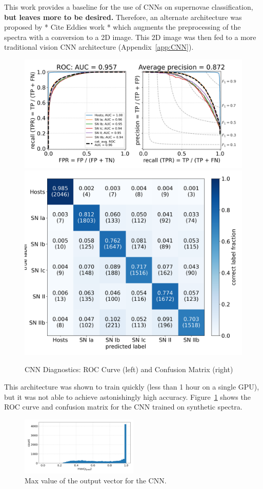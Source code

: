 This work provides a baseline for the use of CNNs on supernovae classification, 
\textbf{but leaves more to be desired.} Therefore, an alternate architecture was proposed 
by * Cite Eddies work * which augments the preprocessing of the spectra with 
a conversion to a 2D image. This 2D image was then fed to a more traditional vision 
CNN architecture (Appendix~\ref{app:CNN}). 
\begin{figure}[t]
    \centering
    \includegraphics[width=.4\textwidth]{figures/cnn/cnn_rocfull.png}
    \includegraphics[width=.4\textwidth]{figures/cnn/cnn_cmfull.png}
    \caption{CNN Diagnostics: ROC Curve (left) and Confusion Matrix (right)\label{fig:cnn_qual}}
\end{figure}
This architecture was shown to train quickly (less than 1 hour on a single GPU), 
but it was not able to achieve astonishingly high accuracy. Figure~\ref{fig:cnn_qual}
shows the ROC curve and confusion matrix for the CNN trained on synthetic spectra. 
\begin{figure}[b]
    \centering
    \includegraphics[width=0.5\textwidth]{figures/cnn/cnn_max_ypred.png}
    \caption{Max value of the output vector for the CNN.\label{fig:cnn_max}}
\end{figure}

